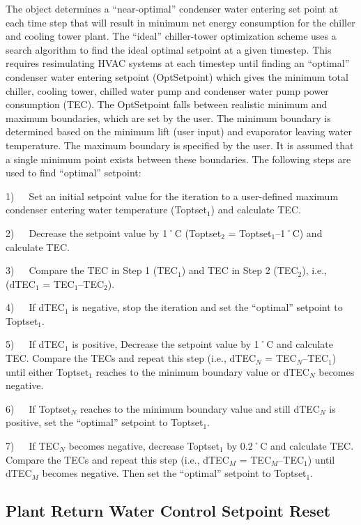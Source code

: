The object determines a ``near-optimal'' condenser water entering set point at each time step that will result in minimum net energy consumption for the chiller and cooling tower plant. The ``ideal'' chiller-tower optimization scheme uses a search algorithm to find the ideal optimal setpoint at a given timestep. This requires resimulating HVAC systems at each timestep until finding an ``optimal'' condenser water entering setpoint (OptSetpoint) which gives the minimum total chiller, cooling tower, chilled water pump and condenser water pump power consumption (TEC). The OptSetpoint falls between realistic minimum and maximum boundaries, which are set by the user. The minimum boundary is determined based on the minimum lift (user input) and evaporator leaving water temperature. The maximum boundary is specified by the user. It is assumed that a single minimum point exists between these boundaries. The following steps are used to find ``optimal'' setpoint:

1)~~~Set an initial setpoint value for the iteration to a user-defined maximum condenser entering water temperature (Toptset\(_{1}\)) and calculate TEC.

2)~~~Decrease the setpoint value by 1˚C (Toptset\(_{2}\) = Toptset\(_{1}\)--1˚C) and calculate TEC.

3)~~~Compare the TEC in Step 1 (TEC\(_{1}\)) and TEC in Step 2 (TEC\(_{2}\)), i.e., (dTEC\(_{1}\) = TEC\(_{1}\)--TEC\(_{2}\)).

4)~~~If dTEC\(_{1}\) is negative, stop the iteration and set the ``optimal'' setpoint to Toptset\(_{1}\).

5)~~~If dTEC\(_{1}\) is positive, Decrease the setpoint value by 1˚C and calculate TEC. Compare the TECs and repeat this step (i.e., dTEC\(_{N}\) = TEC\(_{N}\)--TEC\(_{1}\)) until either Toptset\(_{1}\) reaches to the minimum boundary value or dTEC\(_{N}\) becomes negative.

6)~~~If Toptset\(_{N}\) reaches to the minimum boundary value and still dTEC\(_{N}\) is positive, set the ``optimal'' setpoint to Toptset\(_{1}\).

7)~~~If TEC\(_{N}\) becomes negative, decrease Toptset\(_{1}\) by 0.2˚C and calculate TEC. Compare the TECs and repeat this step (i.e., dTEC\(_{M}\) = TEC\(_{M}\)--TEC\(_{1}\)) until dTEC\(_{M}\) becomes negative. Then set the ``optimal'' setpoint to Toptset\(_{1}\).

\subsection{Plant Return Water Control Setpoint Reset}\label{plant-return-water-control-setpoint-reset}

